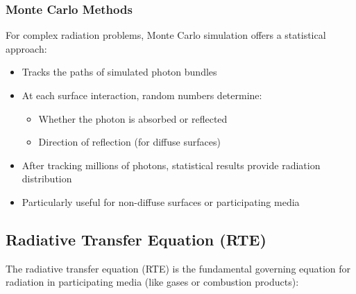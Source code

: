 \subsubsection*{Monte Carlo Methods}

For complex radiation problems, Monte Carlo simulation offers a statistical approach:
\begin{itemize}
    \item Tracks the paths of simulated photon bundles
    \item At each surface interaction, random numbers determine:
    \begin{itemize}
        \item Whether the photon is absorbed or reflected
        \item Direction of reflection (for diffuse surfaces)
    \end{itemize}
    \item After tracking millions of photons, statistical results provide radiation distribution
    \item Particularly useful for non-diffuse surfaces or participating media
\end{itemize}

\subsection*{Radiative Transfer Equation (RTE)}

The radiative transfer equation (RTE) is the fundamental governing equation for radiation in participating media (like gases or combustion products):

